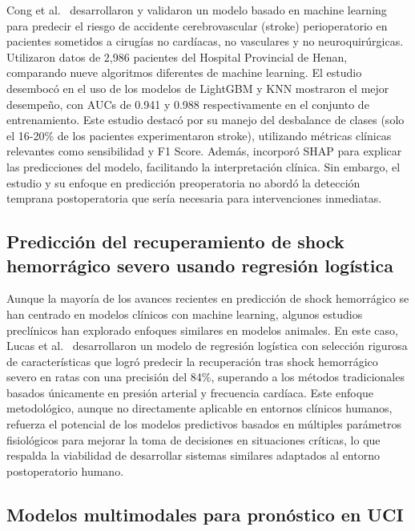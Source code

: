 \documentclass[12pt, letterpaper]{article}
\begin{document}
Cong et al.\ \cite{cong2025} desarrollaron y validaron un modelo basado en machine learning para predecir el riesgo de accidente cerebrovascular (stroke) perioperatorio en pacientes sometidos a cirugías no cardíacas, no vasculares y no neuroquirúrgicas. Utilizaron datos de 2,986 pacientes del Hospital Provincial de Henan, comparando nueve algoritmos diferentes de machine learning. El estudio desembocó en el uso de los modelos de LightGBM y KNN mostraron el mejor desempeño, con AUCs de 0.941 y 0.988 respectivamente en el conjunto de entrenamiento. Este estudio destacó por su manejo del desbalance de clases (solo el 16-20\% de los pacientes experimentaron stroke), utilizando métricas clínicas relevantes como sensibilidad y F1 Score. Además, incorporó SHAP para explicar las predicciones del modelo, facilitando la interpretación clínica. Sin embargo, el estudio y su enfoque en predicción preoperatoria no abordó la detección temprana postoperatoria que sería necesaria para intervenciones inmediatas.

\subsection{Predicción del recuperamiento de shock hemorrágico severo usando regresión logística}

Aunque la mayoría de los avances recientes en predicción de shock hemorrágico se han centrado en modelos clínicos con machine learning, algunos estudios preclínicos han explorado enfoques similares en modelos animales. En este caso, Lucas et al.\ \cite{lucas2019} desarrollaron un modelo de regresión logística con selección rigurosa de características que logró predecir la recuperación tras shock hemorrágico severo en ratas con una precisión del 84\%, superando a los métodos tradicionales basados únicamente en presión arterial y frecuencia cardíaca. Este enfoque metodológico, aunque no directamente aplicable en entornos clínicos humanos, refuerza el potencial de los modelos predictivos basados en múltiples parámetros fisiológicos para mejorar la toma de decisiones en situaciones críticas, lo que respalda la viabilidad de desarrollar sistemas similares adaptados al entorno postoperatorio humano.

\subsection{Modelos multimodales para pronóstico en UCI}
\end{document}
